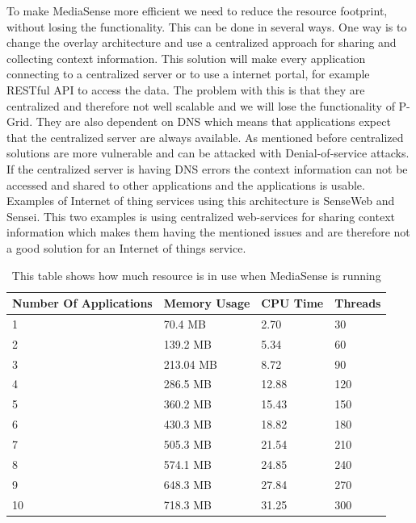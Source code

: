 To make MediaSense more efficient we need to reduce the resource footprint, without losing  the functionality. This can be done in several ways. One way is to change the overlay architecture and use a centralized approach for sharing and collecting context information. This solution will make every application connecting to a centralized server or to use a internet portal, for example RESTful API to access the data. The problem with this is that they are centralized and therefore not well scalable and we will lose the functionality of P-Grid. They are also dependent on DNS which means that applications expect that the centralized server are always available. As mentioned before centralized solutions are more vulnerable and can be attacked with Denial-of-service attacks. If the centralized server is having DNS errors the context information can not be accessed and shared to other applications and the applications is usable. Examples of Internet of thing services using this architecture is SenseWeb and Sensei. This two examples is using centralized web-services for sharing context information which makes them having the mentioned issues and are therefore not a good solution for an Internet of things service.

\begin{center}
\begin{table}
    \begin{tabularx}{\textwidth}{ |X|X|X|X| }
    \hline
    Number Of Applications 								& Memory Usage 									& CPU Time							& Threads\\ \hline
    1 													& 70.4 MB 										& 2.70 								& 30 \\ \hline
    2 													& 139.2 MB										& 5.34 								& 60 \\ \hline
    3 													& 213.04 MB										& 8.72 								& 90 \\ \hline
    4 													& 286.5 MB										& 12.88 							& 120 \\ \hline
    5													& 360.2 MB										& 15.43  							& 150 \\ \hline
    6													& 430.3 MB										& 18.82  							& 180 \\ \hline	
    7													& 505.3 MB										& 21.54  							& 210 \\ \hline
    8													& 574.1 MB										& 24.85  							& 240 \\ \hline
    9													& 648.3 MB										& 27.84	  							& 270 \\ \hline
    10													& 718.3 MB										& 31.25  							& 300 \\ \hline
    \end{tabularx}
   	\caption{This table shows how much resource is in use when MediaSense is running}
	\label{tab:test_table}
\end{table}
\end{center}